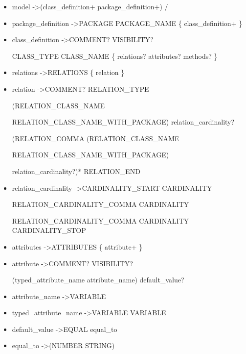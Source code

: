 \begin{itemize}
 \item model   -\textgreater   (class{\_}definition+   \textbar   package{\_}definition+)  /

 \item package{\_}definition   -\textgreater   PACKAGE  PACKAGE{\_}NAME  \{  class{\_}definition+  \}

 \item class{\_}definition   -\textgreater   COMMENT?  VISIBILITY?  
 
 CLASS{\_}TYPE  CLASS{\_}NAME  \{  relations?  attributes?  methods?  \}

 \item relations   -\textgreater   RELATIONS  \{  relation  \}

 \item relation   -\textgreater   COMMENT?  RELATION{\_}TYPE  
 
 (RELATION{\_}CLASS{\_}NAME 
 
 \textbar RELATION{\_}CLASS{\_}NAME{\_}WITH{\_}PACKAGE)  relation{\_}cardinality?  
 
 (RELATION{\_}COMMA  (RELATION{\_}CLASS{\_}NAME 
 
 \textbar RELATION{\_}CLASS{\_}NAME{\_}WITH{\_}PACKAGE)  
 
 relation{\_}cardinality?)*  RELATION{\_}END

 \item relation{\_}cardinality   -\textgreater   CARDINALITY{\_}START  CARDINALITY  
 
 RELATION{\_}CARDINALITY{\_}COMMA   CARDINALITY 
 
 RELATION{\_}CARDINALITY{\_}COMMA  CARDINALITY  CARDINALITY{\_}STOP

 \item attributes   -\textgreater   ATTRIBUTES  \{  attribute+  \}

 \item attribute   -\textgreater   COMMENT?  VISIBILITY?  
 
 (typed{\_}attribute{\_}name \textbar attribute{\_}name)  default{\_}value?

 \item attribute{\_}name   -\textgreater   VARIABLE

 \item typed{\_}attribute{\_}name   -\textgreater   VARIABLE  VARIABLE

 \item default{\_}value   -\textgreater   EQUAL  equal{\_}to

 \item equal{\_}to   -\textgreater   (NUMBER \textbar STRING)


\end{itemize}
